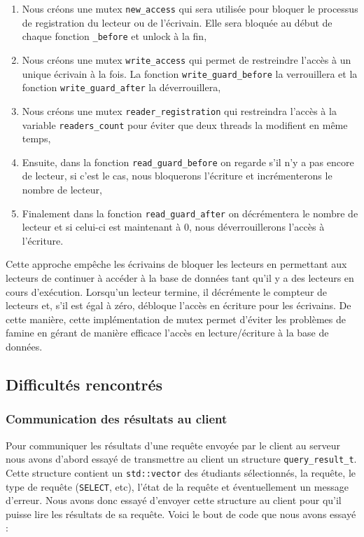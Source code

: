 \documentclass[utf8]{article}
\begin{document}
\begin{enumerate}
	\item Nous créons une mutex \texttt{new\_access} qui sera utilisée pour bloquer le processus de registration du lecteur ou de l'écrivain. Elle sera bloquée au début de chaque fonction \texttt{\_before} et unlock à la fin,
	\item Nous créons une mutex \texttt{write\_access} qui permet de restreindre l'accès à un unique écrivain à la fois. La fonction \texttt{write\_guard\_before} la verrouillera et la fonction \texttt{write\_guard\_after} la déverrouillera,
	\item Nous créons une mutex \texttt{reader\_registration} qui restreindra l'accès à la variable \texttt{readers\_count} pour éviter que deux threads la modifient en même temps,
	\item Ensuite, dans la fonction \texttt{read\_guard\_before} on regarde s'il n'y a pas encore de lecteur, si c'est le cas, nous bloquerons l'écriture et incrémenterons le nombre de lecteur,
	\item Finalement dans la fonction \texttt{read\_guard\_after} on décrémentera le nombre de lecteur et si celui-ci est maintenant à 0, nous déverrouillerons l'accès à l'écriture.
\end{enumerate}

Cette approche empêche les écrivains de bloquer les lecteurs en permettant aux lecteurs de continuer à accéder à la base de données tant qu'il y a des lecteurs en cours d'exécution. Lorsqu'un lecteur termine, il décrémente le compteur de lecteurs et, s'il est égal à zéro, débloque l'accès en écriture pour les écrivains. De cette manière, cette implémentation de mutex permet d'éviter les problèmes de famine en gérant de manière efficace l'accès en lecture/écriture à la base de données.

\subsection{Difficultés rencontrés}

\subsubsection{Communication des résultats au client}


Pour communiquer les résultats d'une requête envoyée par le client au serveur nous avons d'abord essayé de transmettre au client un structure \texttt{query\_result\_t}. Cette structure contient un \texttt{std::vector} des étudiants sélectionnés, la requête, le type de requête (\texttt{SELECT}, etc), l'état de la requête et éventuellement un message d'erreur. Nous avons donc essayé d'envoyer cette structure au client pour qu'il puisse lire les résultats de sa requête. Voici le bout de code que nous avons essayé :
\end{document}
